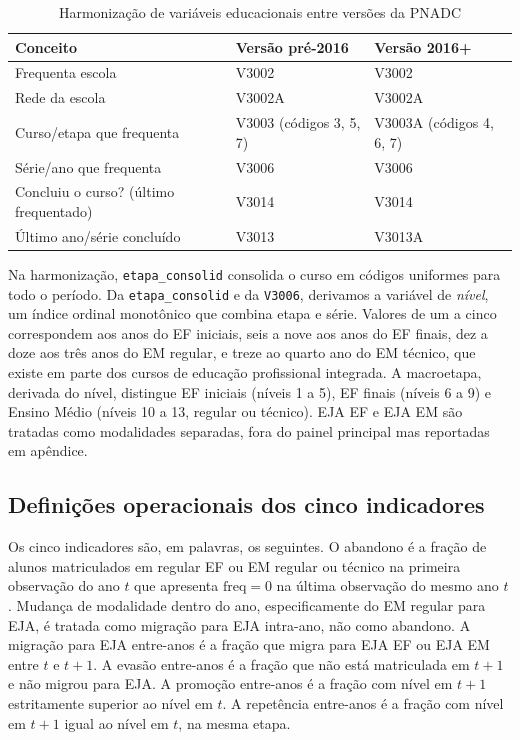 \begin{table}[htbp]
\centering
\caption{Harmonização de variáveis educacionais entre versões da PNADC}
\label{tab:harmonizacao}
\begin{tabular}{lll}
\toprule
Conceito                                 & Versão pré-2016 & Versão 2016+    \\
\midrule
Frequenta escola                         & V3002           & V3002           \\
Rede da escola                           & V3002A          & V3002A          \\
Curso/etapa que frequenta                & V3003 (códigos 3, 5, 7) & V3003A (códigos 4, 6, 7) \\
Série/ano que frequenta                  & V3006 & V3006 \\
Concluiu o curso? (último frequentado)   & V3014 & V3014 \\
Último ano/série concluído               & V3013 & V3013A \\
\bottomrule
\end{tabular}
\end{table}

Na harmonização, \texttt{etapa\_consolid} consolida o curso em
códigos uniformes para todo o período. Da \texttt{etapa\_consolid}
e da \texttt{V3006}, derivamos a variável de \emph{nível}, um
índice ordinal monotônico que combina etapa e série. Valores de
um a cinco correspondem aos anos do EF iniciais, seis a nove aos
anos do EF finais, dez a doze aos três anos do EM regular, e
treze ao quarto ano do EM técnico, que existe em parte dos cursos
de educação profissional integrada. A macroetapa, derivada do
nível, distingue EF iniciais (níveis 1 a 5), EF finais (níveis 6
a 9) e Ensino Médio (níveis 10 a 13, regular ou técnico). EJA EF
e EJA EM são tratadas como modalidades separadas, fora do painel
principal mas reportadas em apêndice.

\subsection{Definições operacionais dos cinco indicadores}
\label{ssec:definicoes}

Os cinco indicadores são, em palavras, os seguintes. O abandono é
a fração de alunos matriculados em regular EF ou EM regular ou
técnico na primeira observação do ano $t$ que apresenta
$\text{freq}=0$ na última observação do mesmo ano $t$. Mudança
de modalidade dentro do ano, especificamente do EM regular para
EJA, é tratada como migração para EJA intra-ano, não como
abandono. A migração para EJA entre-anos é a fração que migra
para EJA EF ou EJA EM entre $t$ e $t+1$. A evasão entre-anos é a
fração que não está matriculada em $t+1$ e não migrou para EJA. A
promoção entre-anos é a fração com nível em $t+1$ estritamente
superior ao nível em $t$. A repetência entre-anos é a fração com
nível em $t+1$ igual ao nível em $t$, na mesma etapa.

